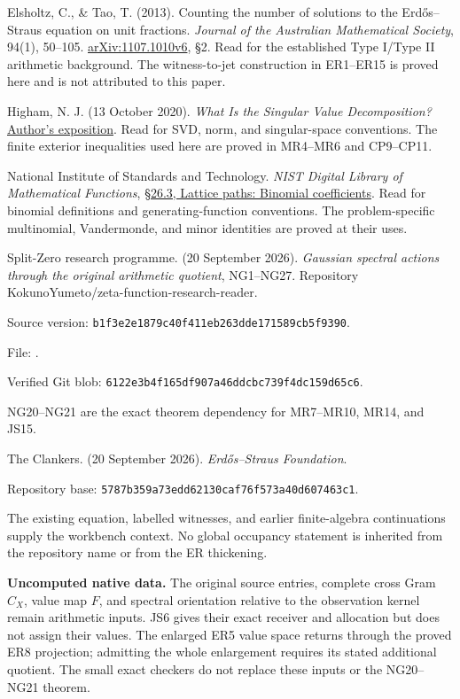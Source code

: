 \documentclass[
  11pt,
]{article}
\begin{document}
Elsholtz, C., \& Tao, T. (2013). Counting the number of solutions to the
Erdős--Straus equation on unit fractions. \emph{Journal of the
Australian Mathematical Society}, 94(1), 50--105.
\href{https://arxiv.org/abs/1107.1010}{arXiv:1107.1010v6}, §2. Read for
the established Type I/Type II arithmetic background. The witness-to-jet
construction in ER1--ER15 is proved here and is not attributed to this
paper.

Higham, N. J. (13 October 2020). \emph{What Is the Singular Value
Decomposition?}
\href{https://nhigham.com/2020/10/13/what-is-the-singular-value-decomposition/}{Author's
exposition}. Read for SVD, norm, and singular-space conventions. The
finite exterior inequalities used here are proved in MR4--MR6 and
CP9--CP11.

National Institute of Standards and Technology. \emph{NIST Digital
Library of Mathematical Functions},
\href{https://dlmf.nist.gov/26.3}{§26.3, Lattice paths: Binomial
coefficients}. Read for binomial definitions and generating-function
conventions. The problem-specific multinomial, Vandermonde, and minor
identities are proved at their uses.

Split-Zero research programme. (20 September 2026). \emph{Gaussian
spectral actions through the original arithmetic quotient}, NG1--NG27.
Repository KokunoYumeto/zeta-function-research-reader.

Source version: \nolinkurl{b1f3e2e1879c40f411eb263dde171589cb5f9390}.

File:
.

Verified Git blob: \nolinkurl{6122e3b4f165df907a46ddcbc739f4dc159d65c6}.

NG20--NG21 are the exact theorem dependency for MR7--MR10, MR14, and
JS15.

The Clankers. (20 September 2026). \emph{Erdős--Straus Foundation}.

Repository base: \nolinkurl{5787b359a73edd62130caf76f573a40d607463c1}.

The existing equation, labelled witnesses, and earlier finite-algebra
continuations supply the workbench context. No global occupancy
statement is inherited from the repository name or from the ER
thickening.

\textbf{Uncomputed native data.} The original source entries, complete
cross Gram \(C_X\), value map \(F\), and spectral orientation relative
to the observation kernel remain arithmetic inputs. JS6 gives their
exact receiver and allocation but does not assign their values. The
enlarged ER5 value space returns through the proved ER8 projection;
admitting the whole enlargement requires its stated additional quotient.
The small exact checkers do not replace these inputs or the NG20--NG21
theorem.
\end{document}
